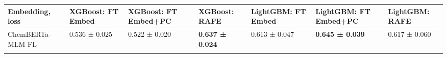 \documentclass[
  10pt,
]{article}
\begin{document}
\begin{longtable}[]{@{}lllllll@{}}
\toprule
\begin{minipage}[b]{0.12\columnwidth}\raggedright
Embedding, loss\strut
\end{minipage} & \begin{minipage}[b]{0.12\columnwidth}\raggedright
XGBoost: FT Embed\strut
\end{minipage} & \begin{minipage}[b]{0.12\columnwidth}\raggedright
XGBoost: FT Embed+PC\strut
\end{minipage} & \begin{minipage}[b]{0.12\columnwidth}\raggedright
XGBoost: RAFE\strut
\end{minipage} & \begin{minipage}[b]{0.12\columnwidth}\raggedright
LightGBM: FT Embed\strut
\end{minipage} & \begin{minipage}[b]{0.12\columnwidth}\raggedright
LightGBM: FT Embed+PC\strut
\end{minipage} & \begin{minipage}[b]{0.12\columnwidth}\raggedright
LightGBM: RAFE\strut
\end{minipage}\tabularnewline
\midrule
\endhead
\begin{minipage}[t]{0.12\columnwidth}\raggedright
ChemBERTa-MLM FL\strut
\end{minipage} & \begin{minipage}[t]{0.12\columnwidth}\raggedright
0.536 ± 0.025\strut
\end{minipage} & \begin{minipage}[t]{0.12\columnwidth}\raggedright
0.522 ± 0.020\strut
\end{minipage} & \begin{minipage}[t]{0.12\columnwidth}\raggedright
\textbf{0.637 ± 0.024}\strut
\end{minipage} & \begin{minipage}[t]{0.12\columnwidth}\raggedright
0.613 ± 0.047\strut
\end{minipage} & \begin{minipage}[t]{0.12\columnwidth}\raggedright
\textbf{0.645 ± 0.039}\strut
\end{minipage} & \begin{minipage}[t]{0.12\columnwidth}\raggedright
0.617 ± 0.060\strut
\end{minipage}\tabularnewline
\begin{minipage}[t]{0.12\columnwidth}\raggedright

\end{minipage}
\end{longtable}
\end{document}
